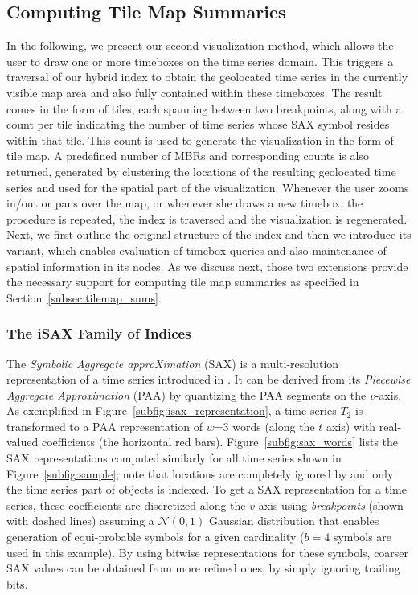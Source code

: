 \subsection{Computing Tile Map Summaries}
\label{sec:tilemap_summary}

In the following, we present our second visualization method, which allows the user to draw one or more timeboxes on the time series domain. This triggers a traversal of our hybrid \hisax index to obtain the geolocated time series in the currently visible map area and also fully contained within these timeboxes. The result comes in the form of tiles, each spanning between two \isax breakpoints, along with a count per tile indicating the number of time series whose SAX symbol resides within that tile. This count is used to generate the visualization in the form of tile map. A predefined number of MBRs and corresponding counts is also returned, generated by clustering the locations of the resulting geolocated time series and used for the spatial part of the visualization. Whenever the user zooms in/out or pans over the map, or whenever she draws a new timebox, the procedure is repeated, the index is traversed and the visualization is regenerated. Next, we first outline the original structure of the \isax index and then we introduce its \hisax variant, which enables evaluation of timebox queries and also maintenance of spatial information in its nodes. As we discuss next, those two extensions provide the necessary support for computing tile map summaries as specified in Section~\ref{subsec:tilemap_sums}.


\subsubsection{The iSAX Family of Indices}
\label{subsec:isax}


The {\em Symbolic Aggregate approXimation} (SAX) is a multi-resolution representation of a time series introduced in \cite{shieh2008kdd}. It can be derived from its {\em Piecewise Aggregate Approximation} (PAA) \cite{keogh2001paa,faloutsos2000vldb} by quantizing the PAA segments on the $v$-axis. As exemplified in Figure~\ref{subfig:isax_representation}, a time series $T_2$ is transformed to a PAA representation of $w$=3 words (along the $t$ axis) with real-valued coefficients (the horizontal red bars). Figure~\ref{subfig:sax_words} lists the SAX representations computed similarly for all time series shown in Figure~\ref{subfig:sample}; note that locations are completely ignored by \isax and only the time series part of objects is indexed. To get a SAX representation for a time series, these coefficients are discretized along the $v$-axis using {\em breakpoints} (shown with dashed lines) assuming a $\mathcal{N}(0,1)$ Gaussian distribution that enables generation of equi-probable symbols for a given cardinality ($b=4$ symbols are used in this example). By using bitwise representations for these symbols, coarser SAX values can be obtained from more refined ones, by simply ignoring trailing bits. 

